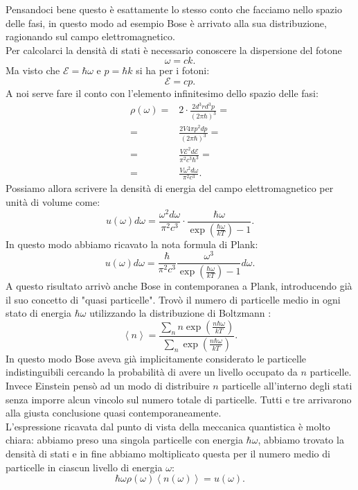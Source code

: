 Pensandoci bene questo è esattamente lo stesso conto che facciamo nello spazio delle fasi, in questo modo ad esempio Bose è arrivato alla sua distribuzione, ragionando sul campo elettromagnetico.\\
Per calcolarci la densità di stati è necessario conoscere la dispersione del fotone
\[
	\omega = ck 
.\] 
Ma visto che $\mathcal{E} = \hbar\omega $ e $p = \hbar k$ si ha per i fotoni:
\[
	\mathcal{E} = cp
.\] 
A noi serve fare il conto con l'elemento infinitesimo dello spazio delle fasi:
\[\begin{aligned}
	\rho ( \omega ) 
	=&
	2 \cdot \frac{2d^3r d^3p}{\left( 2\pi \hbar \right)^3}=\\
	=& \frac{2V 4\pi p^2 dp}{\left( 2\pi\hbar  \right) ^3} =\\
	=& \frac{V\mathcal{E}^2 d\mathcal{E} }{\pi^2c^3\hbar^3}=\\
	=& \frac{V\omega ^2 d\omega }{\pi^2c^3}
.\end{aligned}\]
Possiamo allora scrivere la densità di energia del campo elettromagnetico per unità di volume come:
\[
	u( \omega ) d\omega = \frac{\omega ^2 d\omega }{\pi^2 c^3}\cdot \frac{\hbar\omega }{\exp\left( \frac{\hbar\omega }{kT} \right) -1}  
.\] 
In questo modo abbiamo ricavato la nota formula di Plank:
\[
	u( \omega ) d\omega = \frac{\hbar}{\pi^2 c^3}
	\frac{\omega ^3}{\exp\left( \frac{\hbar\omega }{kT} \right) -1}d\omega 
.\] 
A questo risultato arrivò anche Bose in contemporanea a Plank, introducendo già il suo concetto di "quasi particelle". Trovò il numero di particelle medio in ogni stato di energia $\hbar\omega $ utilizzando la distribuzione di Boltzmann :
\[
	\left<n \right> = \frac{\sum_{n}^{} n \exp\left( \frac{n \hbar \omega }{kT} \right) }{\sum_{n}^{}\exp\left( \frac{n \hbar \omega }{kT} \right)}
.\] 
In questo modo Bose aveva già implicitamente considerato le particelle indistinguibili cercando la probabilità di avere un livello occupato da $n$ particelle.\\
Invece Einstein pensò ad un modo di distribuire  $n$ particelle all'interno degli stati senza imporre alcun vincolo sul numero totale di particelle. Tutti e tre arrivarono alla giusta conclusione quasi contemporaneamente.\\
L'espressione ricavata dal punto di vista della meccanica quantistica è molto chiara: abbiamo preso una singola particelle con energia $\hbar\omega $, abbiamo trovato la densità di stati e in fine abbiamo moltiplicato questa per il numero medio di particelle in ciascun livello di energia $\omega $:
\[
	\hbar \omega  \rho ( \omega ) \left<n( \omega )  \right> = u( \omega ) 
.\] 
